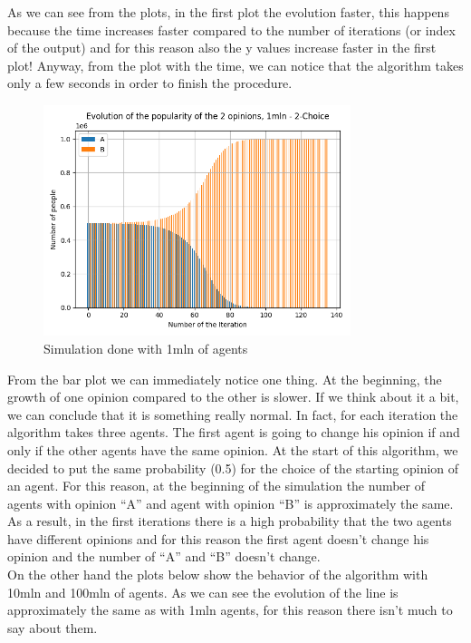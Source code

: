 As we can see from the plots, in the first plot the evolution faster, this happens because the time increases faster compared to the number of iterations (or index of the output) and for this reason also the y values increase faster in the first plot!
Anyway, from the plot with the time, we can notice that the algorithm takes only a few seconds in order to finish the procedure.

\begin{figure}[H]
     \centering
     \includegraphics[width=0.80\textwidth,height=0.37\textheight]{img/svg/2Choices/1mln/barChart.png}
     \caption{Simulation done with 1mln of agents}
\end{figure}

From the bar plot we can immediately notice one thing. At the beginning, the growth of one opinion compared to the other is slower. If we think about it a bit, we can conclude that it is something really normal. In fact, for each iteration the algorithm takes three agents. The first agent is going to change his opinion if and only if the other agents have the same opinion.
At the start of this algorithm, we decided to put the same probability (0.5) for the choice of the starting opinion of an agent. For this reason, at the beginning of the simulation the number of agents with opinion “A” and agent with opinion “B” is approximately the same.
As a result, in the first iterations there is a high probability that the two agents have different opinions and for this reason the first agent doesn’t change his opinion and the number of “A” and “B” doesn’t change.\\
On the other hand the plots below show the behavior of the algorithm with 10mln and 100mln of agents. As we can see the evolution of the line is approximately the same as with 1mln agents, for this reason there isn’t much to say about them.

